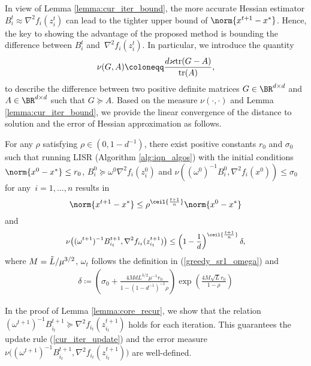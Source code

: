 In view of Lemma \ref{lemma:cur_iter_bound}, the more accurate Hessian estimator $B_i^t\approx \nabla^2 f_i(z_i^t)$ can lead to the tighter upper bound of $\norm{x^{t+1}-x^*}$.
Hence, the key to showing the advantage of the proposed method is bounding the difference between $B_i^t$ and~$\nabla^2 f_i(z_i^t)$.
In particular, we introduce the quantity
\begin{equation}
    \nu(G, A) \coloneqq \frac{d \varkappa {\rm tr}(G-A)}{{\rm tr}(A)},
    \label{nudef}
\end{equation}
to describe the difference between two positive definite matrices $G\in\BR^{d\times d}$ and $A\in\BR^{d\times d}$ such that $G \succeq A$.
Based on the measure $\nu(\cdot,\cdot)$ and Lemma \ref{lemma:cur_iter_bound}, we provide the linear convergence of the distance to solution and the error of Hessian approximation as follows.
\begin{lemma}
For any $\rho$ satisfying $\rho\in(0,1 - d^{-1})$, there exist positive constants $r_0$ and $\sigma_0$ such that running LISR (Algorithm \ref{alg:iqn_algos}) with the initial conditions $\norm{x^0-x^*} \leq r_0$, $B_i^0 \succeq \omega^0 \nabla^2 f_i(z_i^0)$ and $\nu((\omega^0)^{-1}{B_i^0}, \nabla^2 f_i (x^0)) \leq \sigma_0$ for any~$i=1,\dots,n$ results in
 \begin{equation}
        \norm{x^{t+1} - x^*} \leq \rho^{\ceil{\frac{t+1}{n}}} \norm{x^0 - x^*}
        \label{eq:linear_recur_1}
    \end{equation}
and 
    \begin{equation}\label{eq:linear_recur_2}
    \small\begin{split}   
         \nu\big((\omega^{t+1})^{-1} B_{i_t}^{t+1}, \nabla^2 f_{i_t}(z_{i_t}^{t+1})\big) \leq \left(1 - \frac{1}{d}\right)^{\ceil{\frac{t+1}{n}}} \delta,
    \end{split}
    \end{equation}
    where  $M = \Tilde{L} / \mu^{{3}/{2}}$, $\omega_t$ follows the definition in (\ref{greedy_sr1_omega}) and
    \begin{align*}
     \delta \coloneqq \left(\sigma_0 +\frac{4M d L^{{3}/{2}} \mu^{-1} r_0 }{1 - (1-d^{-1})^{-1} \rho}\right)\exp\left(\frac{4M \sqrt{L} r_0}{1 - \rho}\right)   
    \end{align*}
    \label{lemma:core_recur}
\end{lemma}
\begin{remark}
    In the proof of Lemma \ref{lemma:core_recur}, we show that the relation $(\omega^{t+1})^{-1} B_{i_t}^{t+1} \succeq \nabla^2 f_{i_t}(z_{i_t}^{t+1})$ holds for each iteration. This guarantees the update rule (\ref{cur_iter_update}) and the error measure  $\nu\big((\omega^{t+1})^{-1} B_{i_t}^{t+1}, \nabla^2 f_{i_t}(z_{i_t}^{t+1})\big)$ are well-defined.
\end{remark}

